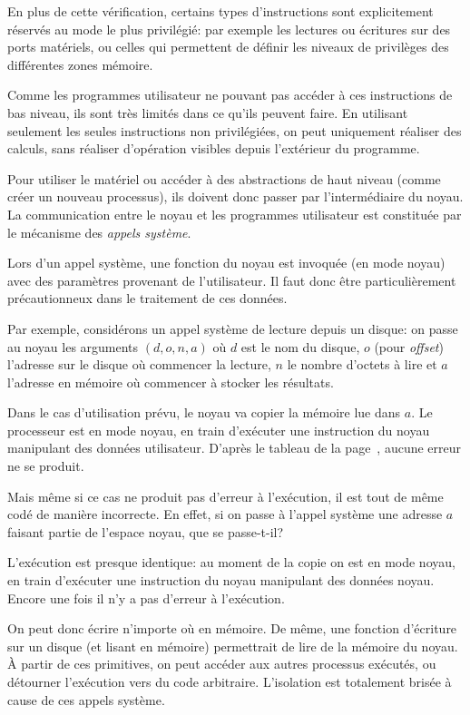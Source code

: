 En plus de cette vérification, certains types d'instructions sont explicitement
réservés au mode le plus privilégié: par exemple les lectures ou écritures sur
des ports matériels, ou celles qui permettent de définir les niveaux de
privilèges des différentes zones mémoire.

Comme les programmes utilisateur ne pouvant pas accéder à ces instructions de
bas niveau, ils sont très limités dans ce qu'ils peuvent faire. En utilisant
seulement les seules instructions non privilégiées, on peut uniquement réaliser
des calculs, sans réaliser d'opération visibles depuis l'extérieur du programme.

Pour utiliser le matériel ou accéder à des abstractions de haut niveau (comme
créer un nouveau processus), ils doivent donc passer par l'intermédiaire du
noyau. La communication entre le noyau et les programmes utilisateur est
constituée par le mécanisme des \emph{appels système}.

Lors d'un appel système, une fonction du noyau est invoquée (en mode noyau) avec
des paramètres provenant de l'utilisateur. Il faut donc être particulièrement
précautionneux dans le traitement de ces données.

Par exemple, considérons un appel système de lecture depuis un disque: on passe
au noyau les arguments $(d, o, n, a)$ où $d$ est le nom du disque, $o$ (pour
\emph{offset}) l'adresse sur le disque où commencer la lecture, $n$ le nombre
d'octets à lire et $a$ l'adresse en mémoire où commencer à stocker les
résultats.

Dans le cas d'utilisation prévu, le noyau va copier la mémoire lue dans $a$. Le
processeur est en mode noyau, en train d'exécuter une instruction du noyau
manipulant des données utilisateur. D'après le tableau de la
page~\pageref{page:erreursec}, aucune erreur ne se produit.

Mais même si ce cas ne produit pas d'erreur à l'exécution, il est tout de même
codé de manière incorrecte. En effet, si on passe à l'appel système une adresse
$a$ faisant partie de l'espace noyau, que se passe-t-il?

L'exécution est presque identique: au moment de la copie on est en mode noyau,
en train d'exécuter une instruction du noyau manipulant des données noyau.
Encore une fois il n'y a pas d'erreur à l'exécution.

On peut donc écrire n'importe où en mémoire. De même, une fonction d'écriture
sur un disque (et lisant en mémoire) permettrait de lire de la mémoire du noyau.
À partir de ces primitives, on peut accéder aux autres processus exécutés, ou
détourner l'exécution vers du code arbitraire. L'isolation est totalement
brisée à cause de ces appels système.


